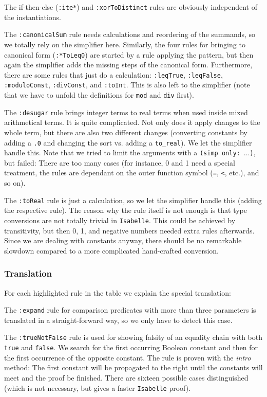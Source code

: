 \documentclass[10pt,a4paper]{article}
\newcommand{\isa}{\texttt{Isabelle}\xspace}
\newcommand{\ttt}{\texttt}
\newcommand{\torealx}{\texttt{to\_real}}
\newcommand{\hl}[1]{{\color{red}#1}}
\newcommand{\true}{\ttt{true}\xspace}
\newcommand{\false}{\ttt{false}\xspace}
\begin{document}
The if-then-else (\ttt{:ite*}) and \ttt{:xorToDistinct} rules are obviously independent of the instantiations.

The \ttt{:canonicalSum} rule needs calculations and reordering of the summands, so we totally rely on the simplifier here. Similarly, the four rules for bringing to canonical form (\ttt{:*ToLeq0}) are started by a rule applying the pattern, but then again the simplifier adds the missing steps of the canonical form. Furthermore, there are some rules that just do a calculation: \ttt{:leqTrue}, \ttt{:leqFalse}, \ttt{:moduloConst}, \ttt{:divConst}, and \ttt{:toInt}. This is also left to the simplifier (note that we have to unfold the definitions for \ttt{mod} and \ttt{div} first).

The \ttt{:desugar} rule brings integer terms to real terms when used inside mixed arithmetical terms. It is quite complicated. Not only does it apply changes to the whole term, but there are also two different changes (converting constants by adding a \ttt{.0} and changing the sort vs. adding a \torealx). We let the simplifier handle this. Note that we tried to limit the arguments with a \ttt{(simp only:~$\dots$)}, but failed: There are too many cases (for instance, 0 and 1 need a special treatment, the rules are dependant on the outer function symbol (\ttt{=}, \ttt{<}, etc.), and so on).

The \ttt{:toReal} rule is just a calculation, so we let the simplifier handle this (adding the respective rule). The reason why the rule itself is not enough is that type conversions are not totally trivial in \isa. This could be achieved by transitivity, but then 0, 1, and negative numbers needed extra rules afterwards. Since we are dealing with constants anyway, there should be no remarkable slowdown compared to a more complicated hand-crafted conversion.
%
\subsubsection*{Translation}
For each \hl{highlighted} rule in the table we explain the special translation:

\smallskip

The \ttt{:expand} rule for comparison predicates with more than three parameters is translated in a straight-forward way, so we only have to detect this case.

The \ttt{:trueNotFalse} rule is used for showing falsity of an equality chain with both \true and \false. We search for the first occurring Boolean constant and then for the first occurrence of the opposite constant. The rule is proven with the \emph{intro} method: The first constant will be propagated to the right until the constants will meet and the proof be finished. There are sixteen possible cases distinguished (which is not necessary, but gives a faster \isa proof).
\end{document}
